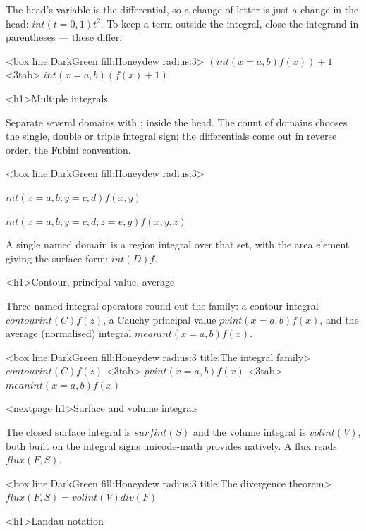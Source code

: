 \documentclass[
  margins=8,
  font=Latin Modern Roman,
  size=12,
  linespread=1.4,
  lang=en,
  precision=4
]{scholatex}
\begin{document}
The head's variable is the differential, so a change of letter is just a
change in the head: $int(t=0, 1) t^2$. To keep a term outside the
integral, close the integrand in parentheses — these differ:

<box line:DarkGreen fill:Honeydew radius:3>{
	$(int(x=a, b) f(x)) + 1$ <3tab> $int(x=a, b) (f(x) + 1)$
}

<h1>Multiple integrals

Separate several domains with ; inside the head. The count of
domains chooses the single, double or triple integral sign; the
differentials come out in reverse order, the Fubini convention.

<box line:DarkGreen fill:Honeydew radius:3>{
	$int(x=a, b ; y=c, d) f(x,y)$

	$int(x=a, b ; y=c, d ; z=e, g) f(x,y,z)$
}

A single named domain is a region integral over that set, with the area
element giving the surface form: $int(D) f$.

<h1>Contour, principal value, average

Three named integral operators round out the family: a contour integral
$contourint(C) f(z)$, a Cauchy principal value $pvint(x=a, b) f(x)$, and
the average (normalised) integral $meanint(x=a, b) f(x)$.

<box line:DarkGreen fill:Honeydew radius:3 title:{The integral family}>{
	$contourint(C) f(z)$ <3tab> $pvint(x=a, b) f(x)$ <3tab> $meanint(x=a, b) f(x)$
}

<nextpage h1>Surface and volume integrals

The closed surface integral is $surfint(S)$ and the volume integral is
$volint(V)$, both built on the integral signs unicode-math provides
natively. A flux reads $flux(F, S)$.

<box line:DarkGreen fill:Honeydew radius:3 title:{The divergence theorem}>{
	$flux(F, S) = volint(V) div(F)$
}

<h1>Landau notation
\end{document}
